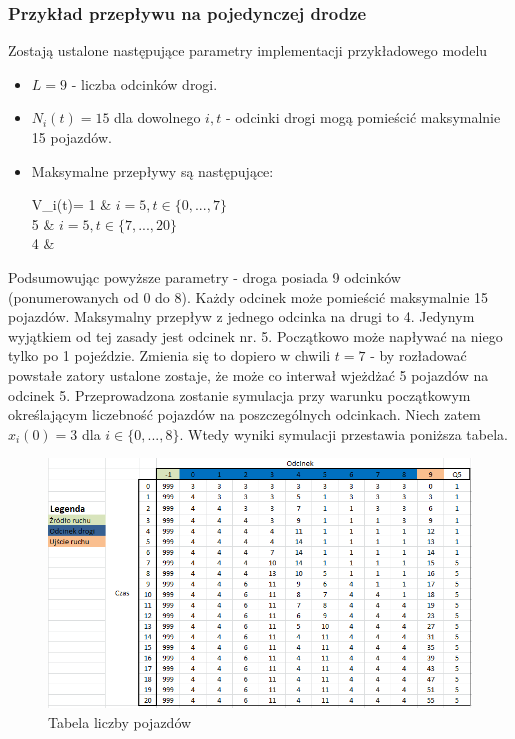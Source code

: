 \documentclass[12pt]{book}
\theoremstyle{plain}
\begin{document}
\subsubsection*{Przykład przepływu na pojedynczej drodze}
Zostają ustalone następujące parametry implementacji przykładowego modelu
\begin{itemize}
	\item $L=9$ - liczba odcinków drogi.
	\item $N_i(t)=15$ dla dowolnego $i,t$ - odcinki drogi mogą pomieścić maksymalnie 15 pojazdów.
	\item Maksymalne przepływy są następujące: \begin{numcases}{V_i(t)=}
	1 &  $i=5, t\in \{0,...,7\}$ \\ 
	5 &  $i=5, t\in \{7,...,20\}$ \\ 	
	4 & 
	\end{numcases}
\end{itemize}
Podsumowując powyższe parametry - droga posiada 9 odcinków (ponumerowanych od 0 do 8). Każdy odcinek może pomieścić maksymalnie 15 pojazdów. Maksymalny przepływ z jednego odcinka na drugi to 4. Jedynym wyjątkiem od tej zasady jest odcinek nr. 5. Początkowo może napływać na niego tylko po 1 pojeździe. Zmienia się to dopiero w chwili $t=7$ - by rozładować powstałe zatory ustalone zostaje, że może co interwał wjeżdżać 5 pojazdów na odcinek 5. Przeprowadzona zostanie symulacja przy warunku początkowym określającym liczebność pojazdów na poszczególnych odcinkach. Niech zatem $x_i(0)=3$ dla $i \in \{0,...,8\}$. Wtedy wyniki symulacji przestawia poniższa tabela.
\begin{figure}[H]
	\centering
	\includegraphics[width=14cm]{images/ctm_przyklad}
	\caption{Tabela liczby pojazdów}
	\label{fig:ctm_przyklad}\end{figure}
\end{document}
